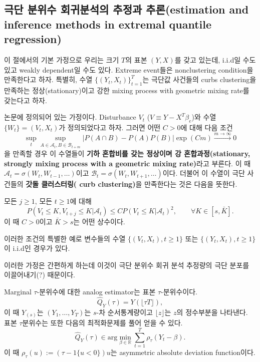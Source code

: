\documentclass[b5paper,]{scrbook}
\theoremstyle{plain}
\theoremstyle{definition}
\numberwithin{equation}{section}
\let\BeginKnitrBlock\begin \let\EndKnitrBlock\end
\begin{document}
\hypertarget{----estimation-and-inference-methods-in-extremal-quantile-regression}{%
\subsection{극단 분위수 회귀분석의 추정과 추론(estimation and inference methods in extremal quantile regression)}\label{----estimation-and-inference-methods-in-extremal-quantile-regression}}

이 절에서의 기본 가정으로 우리는 크기 \(T\)의 표본 \((Y,X)\)를 갖고 있는데, i.i.d일 수도 있고 weakly dependent일 수도 있다. Extreme event들은 nonclustering condition을 만족한다고 하자. 특별히, 수열 \(\{ (Y_{t},X_{t}) \}_{t=1}^{T}\)는 극단값 사건들의 curbs clustering을 만족하는 정상(stationary)이고 강한 mixing process with geometric mixing rate를 갖는다고 하자.

\BeginKnitrBlock{definition}[기하 혼합비를 갖는 정상이며 강 혼합과정]
\protect\hypertarget{def:unnamed-chunk-351}{}{\label{def:unnamed-chunk-351} {} }\citep{Chernozhukov2011}논문에 정의되어 있는 가정이다. Disturbance \(V_{t}\) (\(V\equiv Y-X^{T}\beta_{e}\))와 수열 \(\{W_{t}\}=(V_{t},X_{t})\)가 정의되었다고 하자. 그러면 어떤 \(C>0\)에 대해 다음 조건
\[\sup_{t} \sup_{A\in\mathcal{A}_{t}, B\in\mathcal{B}_{t+m}} |P(A\cap B) - P(A)P(B) |\exp(Cm)\stackrel{m\rightarrow\infty}{\rightarrow} 0 \]
을 만족할 경우 이 수열들이 \textbf{기하 혼합비를 갖는 정상이며 강 혼합과정(stationary, strongly mixing process with a geometric mixing rate)}라고 부른다. 이 때 \(\mathcal{A}_{t}=\sigma(W_{t}, W_{t-1},\ldots)\)이고 \(\mathcal{B}_{t}=\sigma(W_{t},W_{t+1},\ldots)\)이다. 더불어 이 수열이 극단 사건들의 \textbf{갓돌 클러스터링( curb clustering)}을 만족한다는 것은 다음을 뜻한다.

모든 \(j\geq 1\), 모든 \(t\geq 1\)에 대해
\[P(V_{t}\leq K, V_{t+j}\leq K|\mathcal{A}_{t})\leq C P(V_{t}\leq K |\mathcal{A}_{t})^{2}, \qquad{\forall K\in [s, \bar{K}]}.\]
이 때 \(C>0\)이고 \(\bar{K}>s\)는 어떤 상수이다.

이러한 조건의 특별한 예로 변수들의 수열 \(\{ (V_{t}, X_{t}), t \geq 1 \}\) 또는 \(\{(Y_{t},X_{t}), t\geq 1 \}\)이 i.i.d인 경우가 있다.
\EndKnitrBlock{definition}

이러한 가정은 간편하게 하는데 이것이 극단 분위수 회귀 분석 추정량의 극단 분포를 이끌어내기(?) 때문이다.

Marginal \(\tau\)-분위수에 대한 analog estimator는 표본 \(\tau\)-분위수이다.
\[\hat{Q}_{Y}(\tau)=Y(\lfloor \tau T\rfloor),\]
이 때 \(Y_{(s)}\)는 \((Y_{1}, \ldots, Y_{T})\)는 \(s\)-차 순서통계량이고 \(\lfloor z \rfloor\)는 \(z\)의 정수부분을 나타낸다. 표본 \(\tau\)분위수는 또한 다음의 최적화문제를 풀어 얻을 수 있다.
\[\hat{Q}_{Y}(\tau) \in \text{arg}\min_{\beta\in\mathbb{R}} \sum_{t=1}^{T}\rho_{\tau}(Y_{t}-\beta).\]
이 때 \(\rho_{\tau}(u):=(\tau - 1\{ u < 0 \})u\)는 asymmetric absolute deviation function이다.
\end{document}
